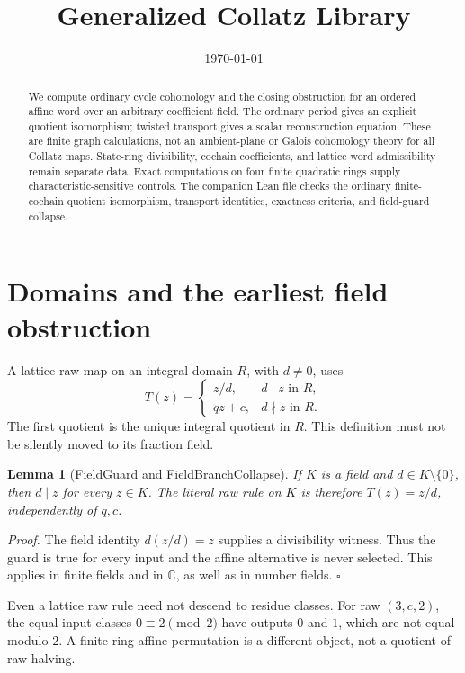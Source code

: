 \documentclass[11pt,letterpaper]{article}
\title{Generalized Collatz Library}
\author{}
\date{\today}
\newcommand{\C}{\mathbb{C}}
\newtheorem{lemma}[theorem]{Lemma}
\newenvironment{proof}{\noindent\textit{Proof.}}{\hfill\(\square\)}
\begin{document}
\maketitle

\begin{abstract}
We compute ordinary cycle cohomology and the closing obstruction for an ordered affine word over an arbitrary coefficient field. The ordinary period gives an explicit quotient isomorphism; twisted transport gives a scalar reconstruction equation. These are finite graph calculations, not an ambient-plane or Galois cohomology theory for all Collatz maps. State-ring divisibility, cochain coefficients, and lattice word admissibility remain separate data. Exact computations on four finite quadratic rings supply characteristic-sensitive controls. The companion Lean file checks the ordinary finite-cochain quotient isomorphism, transport identities, exactness criteria, and field-guard collapse.
\end{abstract}

\section{Domains and the earliest field obstruction}

A lattice raw map on an integral domain \(R\), with \(d\ne0\), uses
\[
T(z)=\begin{cases}z/d,&d\mid z\text{ in }R,\\qz+c,&d\nmid z\text{ in }R.\end{cases}
\]
The first quotient is the unique integral quotient in \(R\). This definition must not be silently moved to its fraction field.

\begin{lemma}[FieldGuard and FieldBranchCollapse]
If \(K\) is a field and \(d\in K\setminus\{0\}\), then \(d\mid z\) for every \(z\in K\). The literal raw rule on \(K\) is therefore \(T(z)=z/d\), independently of \(q,c\).
\end{lemma}
\begin{proof}
The field identity \(d(z/d)=z\) supplies a divisibility witness. Thus the guard is true for every input and the affine alternative is never selected. This applies in finite fields and in \(\C\), as well as in number fields.
\end{proof}

Even a lattice raw rule need not descend to residue classes. For raw \((3,c,2)\), the equal input classes \(0\equiv2\pmod2\) have outputs \(0\) and \(1\), which are not equal modulo \(2\). A finite-ring affine permutation is a different object, not a quotient of raw halving.
\end{document}
